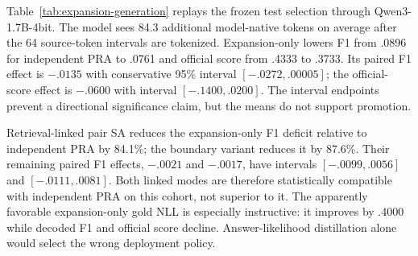 \documentclass[11pt]{article}
\begin{document}
Table~\ref{tab:expansion-generation} replays the frozen test selection through
Qwen3-1.7B-4bit. The model sees 84.3 additional model-native tokens on average
after the 64 source-token intervals are tokenized. Expansion-only lowers F1
from .0896 for independent PRA to .0761 and official score from .4333 to
.3733. Its paired F1 effect is $-.0135$ with conservative 95\% interval
$[-.0272,.00005]$; the official-score effect is $-.0600$ with interval
$[-.1400,.0200]$. The interval endpoints prevent a directional significance
claim, but the means do not support promotion.

\begin{table}[t]
\centering
\small
\caption{Frozen 150-question Qwen3-1.7B native generation replay. Lower NLL is
better; times are per question in milliseconds. Linked masks execute a dense
host kernel and are mechanism controls, not sparse-speed results.}
\label{tab:expansion-generation}
\end{table}

Retrieval-linked pair SA reduces the expansion-only F1 deficit relative to
independent PRA by 84.1\%; the boundary variant reduces it by 87.6\%. Their
remaining paired F1 effects, $-.0021$ and $-.0017$, have intervals
$[-.0099,.0056]$ and $[-.0111,.0081]$. Both linked modes are therefore
statistically compatible with independent PRA on this cohort, not superior to
it. The apparently favorable expansion-only gold NLL is especially
instructive: it improves by .4000 while decoded F1 and official score decline.
Answer-likelihood distillation alone would select the wrong deployment policy.
\end{document}
